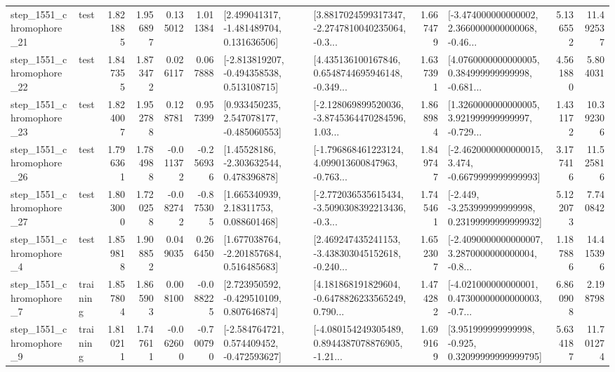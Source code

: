 \begin{tabular}{llrrrrllrlrr}
 step\_1551\_chromophore\_21 &      test &      1.821885 &    1.956897 &      0.135012 &  1.011384 &    [2.499041317, -1.481489704, 0.131636506] &  [3.8817024599317347, -2.2747810040235064, -0.3... &       1.667479 &  [-3.474000000000002, 2.3660000000000068, -0.46... &            5.136552 &         11.492537 \\
 step\_1551\_chromophore\_22 &      test &      1.847355 &    1.873472 &      0.026117 &  0.067888 &   [-2.813819207, -0.494358538, 0.513108715] &  [4.435136100167846, 0.6548744695946148, -0.349... &       1.637391 &  [4.0760000000000005, 0.384999999999998, -0.681... &            4.561880 &          5.804031 \\
 step\_1551\_chromophore\_23 &      test &      1.824007 &    1.952788 &      0.128781 &  0.957399 &    [0.933450235, 2.547078177, -0.485060553] &  [-2.128069899520036, -3.8745364470284596, 1.03... &       1.868984 &  [1.3260000000000005, 3.921999999999997, -0.729... &            1.431172 &         10.392306 \\
 step\_1551\_chromophore\_26 &      test &      1.796361 &    1.784988 &     -0.011372 & -0.256936 &     [1.45528186, -2.303632544, 0.478396878] &  [-1.796868461223124, 4.099013600847963, -0.763... &       1.849747 &  [-2.4620000000000015, 3.474, -0.6679999999999993] &            3.177416 &         11.525816 \\
 step\_1551\_chromophore\_27 &      test &      1.803000 &    1.720258 &     -0.082742 & -0.875305 &      [1.665340939, 2.18311753, 0.088601468] &  [-2.772036535615434, -3.5090308392213436, -0.3... &       1.745461 &  [-2.449, -3.253999999999998, 0.23199999999999932] &            5.122073 &          7.740842 \\
  step\_1551\_chromophore\_4 &      test &      1.859818 &    1.908852 &      0.049035 &  0.266450 &    [1.677038764, -2.201857684, 0.516485683] &  [2.469247435241153, -3.438303045152618, -0.240... &       1.652307 &  [-2.4090000000000007, 3.2870000000000004, -0.8... &            1.187886 &         14.415396 \\
  step\_1551\_chromophore\_7 &  training &      1.857804 &    1.865903 &      0.008100 & -0.088225 &    [2.723950592, -0.429510109, 0.807646874] &  [4.181868191829604, -0.6478826233565249, 0.790... &       1.474282 &  [-4.021000000000001, 0.47300000000000003, -0.7... &            6.860908 &          2.198798 \\
  step\_1551\_chromophore\_9 &  training &      1.810211 &    1.747611 &     -0.062600 & -0.700790 &   [-2.584764721, 0.574409452, -0.472593627] &  [-4.080154249305489, 0.8944387078876905, -1.21... &       1.699169 &   [3.951999999999998, -0.925, 0.32099999999999795] &            5.634187 &         11.701274 \\

\end{tabular}
